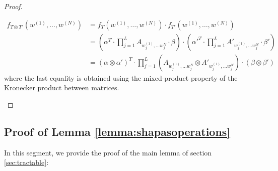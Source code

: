 \begin{proof}
\begin{enumerate}
    \begin{align*}
        f_{T \otimes T'}(w^{(1)}, \ldots, w^{(N)}) &= f_{T}(w^{(1)}, \ldots, w^{(N)}) \cdot f_{T'}(w^{(1)}, \ldots, w^{(N)}) \\
        &= (\alpha^{T} \cdot \prod\limits_{j=1}^{L} A_{w_{j}^{(1)}, \ldots w_{j}^{N}} \cdot \beta) \cdot (\alpha'^{T} \cdot \prod\limits_{j=1}^{L} A'_{w_{j}^{(1)}, \ldots w_{j}^{N}} \cdot \beta') \\
        &=  (\alpha \otimes \alpha')^{T} \cdot \prod\limits_{j=1}^{L} \left( A_{w_{j}^{(1)}, \ldots w_{j}^{N}} \otimes A'_{w_{j}^{(1)}, \ldots w_{j}^{N}} \right) \cdot (\beta \otimes \beta')
    \end{align*}
    where the last equality is obtained using the mixed-product property of the Kronecker product between matrices.
    \end{enumerate}
\end{proof}

\subsection{Proof of Lemma \ref{lemma:shapasoperations}}

In this segment, we provide the proof of the main lemma of section \ref{sec:tractable}:

